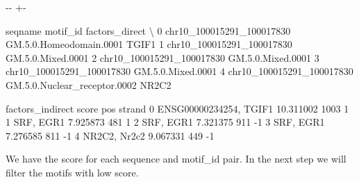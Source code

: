 \documentclass[letterpaper,10pt,english]{sphinxmanual}
\newlength\nbsphinxcodecellspacing
\begin{document}
{
\begin{sphinxVerbatim}[commandchars=\\\{\}]
\llap{\color{nbsphinxin}[16]:\,\hspace{\fboxrule}\hspace{\fboxsep}}
\end{sphinxVerbatim}
}

{

\kern-\sphinxverbatimsmallskipamount\kern-\baselineskip
\kern+\FrameHeightAdjust\kern-\fboxrule
\vspace{\nbsphinxcodecellspacing}

\begin{sphinxVerbatim}[commandchars=\\\{\}]
\llap{\color{nbsphinxout}[16]:\,\hspace{\fboxrule}\hspace{\fboxsep}}                     seqname                      motif\_id factors\_direct  \textbackslash{}
0  chr10\_100015291\_100017830       GM.5.0.Homeodomain.0001          TGIF1
1  chr10\_100015291\_100017830             GM.5.0.Mixed.0001
2  chr10\_100015291\_100017830             GM.5.0.Mixed.0001
3  chr10\_100015291\_100017830             GM.5.0.Mixed.0001
4  chr10\_100015291\_100017830  GM.5.0.Nuclear\_receptor.0002          NR2C2

         factors\_indirect      score   pos  strand
0  ENSG00000234254, TGIF1  10.311002  1003       1
1               SRF, EGR1   7.925873   481       1
2               SRF, EGR1   7.321375   911      -1
3               SRF, EGR1   7.276585   811      -1
4            NR2C2, Nr2c2   9.067331   449      -1
\end{sphinxVerbatim}
}

We have the score for each sequence and motif\_id pair. In the next step we will filter the motifs with low score.
\end{document}
